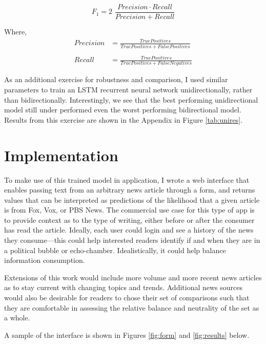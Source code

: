 \documentclass{article}
\begin{document}
	\begin{equation*}
		F_1 =  2 \,\, \frac{Precision \cdot Recall}{Precision + Recall}
	\end{equation*}
	
	Where, 
	\begin{align*}
		Precision &= \frac{True Positives}{True Positives + False Positives}\\ \\
		Recall &= \frac{True Positives}{True Positives + False Negatives}
	\end{align*}
	
	As an additional exercise for robustness and comparison, I used similar parameters to train an LSTM recurrent neural network unidirectionally, rather than bidirectionally. Interestingly, we see that the best performing unidirectional model still under performed even the worst performing bidirectional model. Results from this exercise are shown in the Appendix in Figure \ref{tab:unires}.
	
	
	\section{Implementation}
	
	To make use of this trained model in application, I wrote a web interface that enables passing text from an arbitrary news article through a form, and returns values that can be interpreted as predictions of the likelihood that a given article is from Fox, Vox, or PBS News. The commercial use case for this type of app is to provide context as to the type of writing, either before or after the consumer has read the article. Ideally, each user could login and see a history of the news they consume---this could help interested readers identify if and when they are in a political bubble or echo-chamber. Idealistically, it could help balance information consumption. 
	
	Extensions of this work would include more volume and more recent news articles as to stay current with changing topics and trends. Additional news sources would also be desirable for readers to chose their set of comparisons such that they are comfortable in assessing the relative balance and neutrality of the set as a whole. 
	
	A sample of the interface is shown in Figures \ref{fig:form} and \ref{fig:results} below. 	
	
\end{document}
